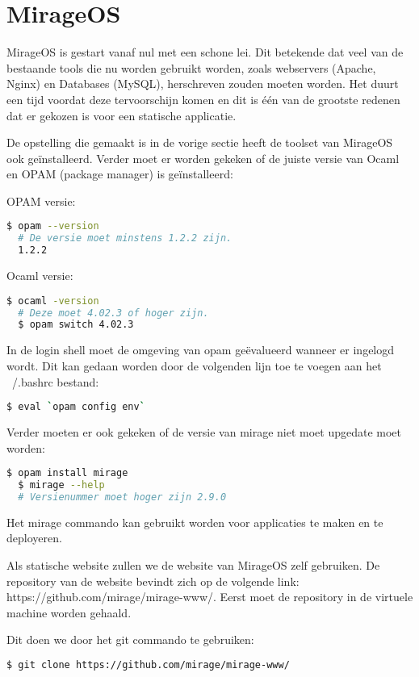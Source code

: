 \section{MirageOS}

MirageOS is gestart vanaf nul met een schone lei. Dit betekende dat veel van de bestaande tools die nu worden gebruikt worden, zoals webservers (Apache, Nginx) en Databases (MySQL), herschreven zouden moeten worden. Het duurt een tijd voordat deze tervoorschijn komen en dit is één van de grootste redenen dat er gekozen is voor een statische applicatie.

De opstelling die gemaakt is in de vorige sectie heeft de toolset van MirageOS ook geïnstalleerd. Verder moet er worden gekeken of de juiste versie van Ocaml en OPAM (package manager) is geïnstalleerd:

\noindent OPAM versie:
\begin{lstlisting}[language=bash]
  $ opam --version
  # De versie moet minstens 1.2.2 zijn.
  1.2.2
\end{lstlisting}

\noindent Ocaml versie:
\begin{lstlisting}[language=bash]
  $ ocaml -version
  # Deze moet 4.02.3 of hoger zijn.
  $ opam switch 4.02.3
\end{lstlisting}

In de login shell moet de omgeving van opam geëvalueerd wanneer er ingelogd wordt. Dit kan gedaan worden door de volgenden lijn toe te voegen aan het ~/.bashrc bestand:

\begin{lstlisting}[language=bash]
  $ eval `opam config env`
\end{lstlisting}

\noindent Verder moeten er ook gekeken of de versie van mirage niet moet upgedate moet worden:
\begin{lstlisting}[language=bash]
  $ opam install mirage
  $ mirage --help
  # Versienummer moet hoger zijn 2.9.0
\end{lstlisting}

Het mirage commando kan gebruikt worden voor applicaties te maken en te deployeren.

Als statische website zullen we de website van MirageOS zelf gebruiken. De repository van de website bevindt zich op de volgende link: https://github.com/mirage/mirage-www/. Eerst moet de repository in de virtuele machine worden gehaald. 

\noindent Dit doen we door het git commando te gebruiken:
\begin{lstlisting}[language=bash]
  $ git clone https://github.com/mirage/mirage-www/
\end{lstlisting}

